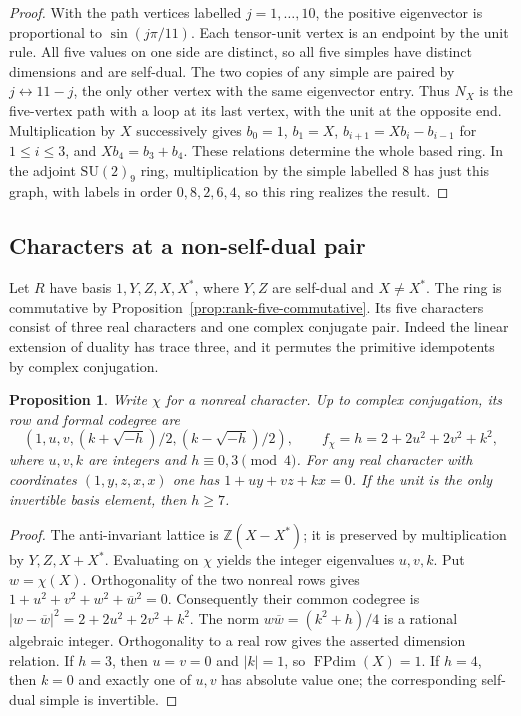 \documentclass[11pt,a4paper]{article}
\newtheorem{proposition}[theorem]{Proposition}
\numberwithin{equation}{section}
\begin{document}
\begin{proof}
With the path vertices labelled $j=1,\ldots,10$, the positive eigenvector is proportional to $\sin(j\pi/11)$. Each tensor-unit vertex is an endpoint by the unit rule. All five values on one side are distinct, so all five simples have distinct dimensions and are self-dual. The two copies of any simple are paired by $j\leftrightarrow11-j$, the only other vertex with the same eigenvector entry. Thus $N_X$ is the five-vertex path with a loop at its last vertex, with the unit at the opposite end. Multiplication by $X$ successively gives $b_0=1$, $b_1=X$, $b_{i+1}=Xb_i-b_{i-1}$ for $1\le i\le3$, and $Xb_4=b_3+b_4$. These relations determine the whole based ring. In the adjoint $\mathrm{SU}(2)_9$ ring, multiplication by the simple labelled $8$ has just this graph, with labels in order $0,8,2,6,4$, so this ring realizes the result.
\end{proof}



\subsection{Characters at a non-self-dual pair}\label{sec:onepair}

Let $R$ have basis $1,Y,Z,X,X^*$, where $Y,Z$ are self-dual and
$X\ne X^*$. The ring is commutative by Proposition~\ref{prop:rank-five-commutative}.
Its five characters consist of three real characters and one complex
conjugate pair. Indeed the linear extension of duality has trace three,
and it permutes the primitive idempotents by complex conjugation.

\begin{proposition}
Write $\chi$ for a nonreal character. Up to complex conjugation,
its row and formal codegree are
\[
 (1,u,v,(k+\sqrt{-h})/2,(k-\sqrt{-h})/2),\qquad
 f_\chi=h=2+2u^2+2v^2+k^2,
\]
where $u,v,k$ are integers and $h\equiv0,3\pmod 4$.
For any real character with coordinates $(1,y,z,x,x)$ one has
$1+uy+vz+kx=0$.
If the unit is the only invertible basis element, then $h\ge7$.
\end{proposition}
\begin{proof}
The anti-invariant lattice is $\mathbb Z(X-X^*)$; it is preserved by
multiplication by $Y,Z,X+X^*$. Evaluating on $\chi$ yields the
integer eigenvalues $u,v,k$. Put $w=\chi(X)$.
Orthogonality of the two nonreal rows gives
$1+u^2+v^2+w^2+\overline w^2=0$. Consequently their common codegree
is $|w-\overline w|^2=2+2u^2+2v^2+k^2$. The norm
$w\overline w=(k^2+h)/4$ is a rational algebraic integer.
Orthogonality to a real row gives the asserted dimension relation.
If $h=3$, then $u=v=0$ and $|k|=1$, so $\operatorname{FPdim}(X)=1$.
If $h=4$, then $k=0$ and exactly one of $u,v$ has absolute value one;
the corresponding self-dual simple is invertible.
\end{proof}
\end{document}
